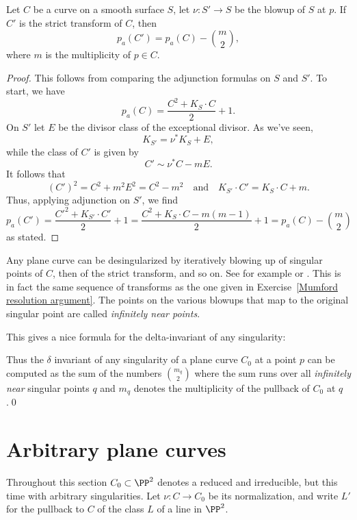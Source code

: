 \begin{proposition}\label{effect of blowup on genus}
 Let $C$ be a curve on a smooth surface $S$, let $\nu : S' \to S$ be the blowup of $S$ at $p$. If $C'$ is the strict transform of $C$, then
 $$
 p_a(C') = p_a(C) -{m\choose 2},
 $$
 where $m$ is the multiplicity of $p\in C$.
\end{proposition}
\begin{proof}
This follows from comparing the adjunction formulas on $S$ and $S'$. To start, we have
$$
p_a(C) = \frac{C^2 + K_S\cdot C}{2} + 1.
$$
On $S'$ let $E$ be the divisor class of the exceptional divisor. As we've seen,
$$
K_{S'} = \nu^*K_S + E,
$$
while the class of $C'$ is given by
$$
C' \sim \nu^*C - mE.
$$
It follows that
$$
(C')^2 = C^2 + m^2E^2 = C^2 - m^2 \quad \text{and} \quad K_{S'}\cdot C' = K_S\cdot C + m.
$$
Thus, applying adjunction on $S'$, we find
$$
p_a(C') = \frac{{C'}^2 + K_{S'}\cdot C'}{2} + 1 = \frac{C^2 + K_S\cdot C - m(m-1)}{2} + 1 = p_a(C) -{m\choose 2}
$$
as stated.
\end{proof}

\begin{fact}
Any plane curve can be desingularized by
iteratively blowing up of singular points of $C$, then of the strict transform, and so on. See for example
\cite{Fulton1989} or \cite{Brieskorn1986}.  This is in fact the same
sequence of transforms as the one given in Exercise~\ref{Mumford resolution argument}. 
The points on the various blowups that
map to the original singular point are called \emph{infinitely near points}.
\end{fact}

This gives a nice formula for the delta-invariant of any singularity:

\begin{corollary}
\label{computing delta}

Thus the $\delta$ invariant of any singularity of a plane curve $C_{0}$ at a point $p$ can be computed as the sum of the numbers $\binom{m_{q}}{2}$
where the sum runs over all \emph{infinitely near} singular points $q$ and $m_{q}$
denotes the multiplicity of the pullback of $C_{0}$ at $q$.\qed
\end{corollary}

\section{Arbitrary plane curves} \label{arbitrary plane curves}

Throughout this section $C_0 \subset \PP^2$ denotes a reduced and irreducible, but  this time with arbitrary singularities. Let $\nu : C \to C_0$ be its normalization, and write $L'$ for the pullback to $C$ of the class $L$ of a line in $\PP^{2}$.

